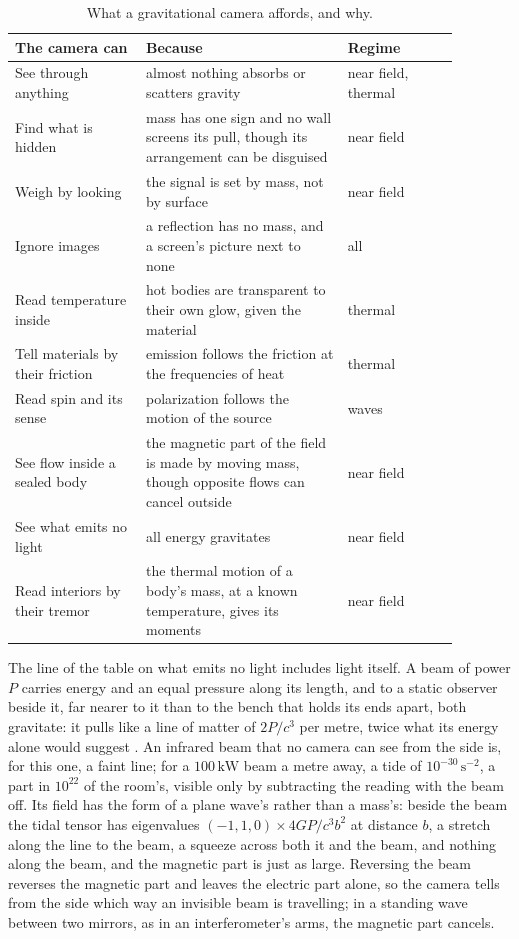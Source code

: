 \begin{table}
\centering
\begin{tabular}{p{0.26\linewidth}p{0.4\linewidth}p{0.22\linewidth}}
The camera can & Because & Regime \\ \hline
See through anything & almost nothing absorbs or scatters gravity & near field, thermal \\
Find what is hidden & mass has one sign and no wall screens its pull, though its arrangement can be disguised & near field \\
Weigh by looking & the signal is set by mass, not by surface & near field \\
Ignore images & a reflection has no mass, and a screen's picture next to none & all \\
Read temperature inside & hot bodies are transparent to their own glow, given the material & thermal \\
Tell materials by their friction & emission follows the friction at the frequencies of heat & thermal \\
Read spin and its sense & polarization follows the motion of the source & waves \\
See flow inside a sealed body & the magnetic part of the field is made by moving mass, though opposite flows can cancel outside & near field \\
See what emits no light & all energy gravitates & near field \\
Read interiors by their tremor & the thermal motion of a body's mass, at a known temperature, gives its moments & near field \\
\end{tabular}
\caption{What a gravitational camera affords, and why.}\label{tab:affordances}
\end{table}

The line of the table on what emits no light includes light itself. A beam of power $P$ carries
energy and an equal pressure along its length, and to a static observer beside
it, far nearer to it than to the bench that holds its ends apart, both gravitate: it pulls like a line of matter of $2P/c^{3}$ per metre,
twice what its energy alone would suggest \cite{TolmanEhrenfestPodolsky1931}.
An infrared beam that no camera can see from the side is, for this one, a
faint line; for a $100\,\mathrm{kW}$ beam a metre away, a tide of
$10^{-30}\,\mathrm{s^{-2}}$, a part in $10^{22}$ of the room's, visible only by
subtracting the reading with the beam off. Its field has the form of a plane wave's rather than a
mass's: beside the beam the tidal tensor has eigenvalues
$(-1, 1, 0)\times 4GP/c^{3}b^{2}$ at distance $b$, a stretch along the line to
the beam, a squeeze across both it and the beam, and nothing along the beam,
and the magnetic part is just as large. Reversing the beam reverses the magnetic part and leaves the electric
part alone, so the camera tells from the side which way an invisible beam is
travelling; in a standing wave between two mirrors, as in an interferometer's
arms, the magnetic part cancels.

